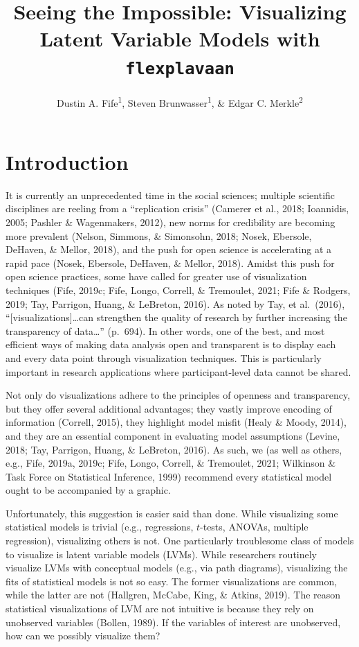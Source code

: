 \documentclass[
  english,
  man]{apa6}
\title{Seeing the Impossible: Visualizing Latent Variable Models with \texttt{flexplavaan}}
\author{Dustin A. Fife\textsuperscript{1}, Steven Brunwasser\textsuperscript{1}, \& Edgar C. Merkle\textsuperscript{2}}
\date{}
\affiliation{\vspace{0.5cm}\textsuperscript{1} Rowan University\\\textsuperscript{2} University of Missouri}
\begin{document}
\maketitle

\hypertarget{introduction}{%
\section{Introduction}\label{introduction}}

It is currently an unprecedented time in the social sciences; multiple scientific disciplines are reeling from a ``replication crisis'' (Camerer et al., 2018; Ioannidis, 2005; Pashler \& Wagenmakers, 2012), new norms for credibility are becoming more prevalent (Nelson, Simmons, \& Simonsohn, 2018; Nosek, Ebersole, DeHaven, \& Mellor, 2018), and the push for open science is accelerating at a rapid pace (Nosek, Ebersole, DeHaven, \& Mellor, 2018). Amidst this push for open science practices, some have called for greater use of visualization techniques (Fife, 2019c; Fife, Longo, Correll, \& Tremoulet, 2021; Fife \& Rodgers, 2019; Tay, Parrigon, Huang, \& LeBreton, 2016). As noted by Tay, et al.~(2016), ``{[}visualizations{]}\ldots can strengthen the quality of research by further increasing the transparency of data\ldots{}'' (p.~694). In other words, one of the best, and most efficient ways of making data analysis open and transparent is to display each and every data point through visualization techniques. This is particularly important in research applications where participant-level data cannot be shared.

Not only do visualizations adhere to the principles of openness and transparency, but they offer several additional advantages; they vastly improve encoding of information (Correll, 2015), they highlight model misfit (Healy \& Moody, 2014), and they are an essential component in evaluating model assumptions (Levine, 2018; Tay, Parrigon, Huang, \& LeBreton, 2016). As such, we (as well as others, e.g., Fife, 2019a, 2019c; Fife, Longo, Correll, \& Tremoulet, 2021; Wilkinson \& Task Force on Statistical Inference, 1999) recommend every statistical model ought to be accompanied by a graphic.

Unfortunately, this suggestion is easier said than done. While visualizing some statistical models is trivial (e.g., regressions, \(t\)-tests, ANOVAs, multiple regression), visualizing others is not. One particularly troublesome class of models to visualize is latent variable models (LVMs). While researchers routinely visualize LVMs with conceptual models (e.g., via path diagrams), visualizing the fits of statistical models is not so easy. The former visualizations are common, while the latter are not (Hallgren, McCabe, King, \& Atkins, 2019). The reason statistical visualizations of LVM are not intuitive is because they rely on unobserved variables (Bollen, 1989). If the variables of interest are unobserved, how can we possibly visualize them?
\end{document}

